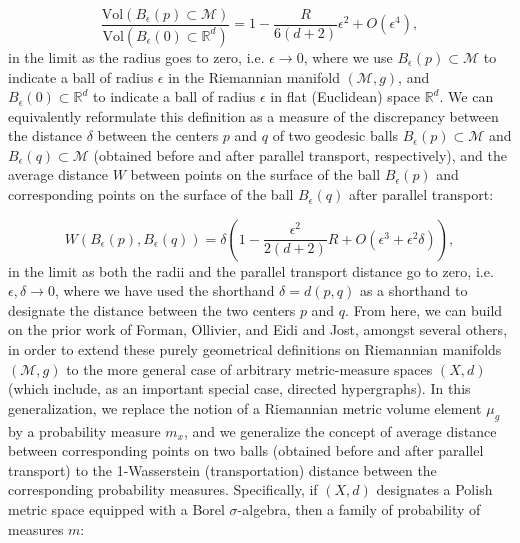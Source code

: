 \documentclass{article}
\begin{document}
\begin{equation}
\frac{\mathrm{Vol} \left( B_{\epsilon} \left( p \right) \subset \mathcal{M} \right)}{\mathrm{Vol} \left( B_{\epsilon} \left( 0 \right) \subset \mathbb{R}^d \right)} = 1 - \frac{R}{6 \left( d + 2 \right)} \epsilon^2 + O \left( \epsilon^4 \right),
\end{equation}
in the limit as the radius goes to zero, i.e. ${\epsilon \to 0}$, where we use ${B_{\epsilon} \left( p \right) \subset \mathcal{M}}$ to indicate a ball of radius ${\epsilon}$ in the Riemannian manifold ${\left( \mathcal{M}, g \right)}$, and ${B_{\epsilon} \left( 0 \right) \subset \mathbb{R}^d}$ to indicate a ball of radius ${\epsilon}$ in flat (Euclidean) space ${\mathbb{R}^d}$. We can equivalently reformulate this definition as a measure of the discrepancy between the distance ${\delta}$ between the centers $p$ and $q$ of two geodesic balls ${B_{\epsilon} \left( p \right) \subset \mathcal{M}}$ and ${B_{\epsilon} \left( q \right) \subset \mathcal{M}}$ (obtained before and after parallel transport, respectively), and the average distance $W$ between points on the surface of the ball ${B_{\epsilon} \left( p \right)}$ and corresponding points on the surface of the ball ${B_{\epsilon} \left( q \right)}$ after parallel transport:

\begin{equation}
W \left( B_{\epsilon} \left( p \right), B_{\epsilon} \left( q \right) \right) = \delta \left( 1 - \frac{\epsilon^2}{2 \left( d + 2 \right)} R + O \left( \epsilon^3 + \epsilon^2 \delta \right) \right),
\end{equation}
in the limit as both the radii and the parallel transport distance go to zero, i.e. ${\epsilon, \delta \to 0}$, where we have used the shorthand ${\delta = d \left( p, q \right)}$ as a shorthand to designate the distance between the two centers $p$ and $q$. From here, we can build on the prior work of Forman\cite{forman}, Ollivier\cite{ollivier}\cite{ollivier2}\cite{ollivier3}, and Eidi and Jost\cite{eidi}, amongst several others, in order to extend these purely geometrical definitions on Riemannian manifolds ${\left( \mathcal{M}, g \right)}$ to the more general case of arbitrary metric-measure spaces ${\left( X, d \right)}$ (which include, as an important special case, directed hypergraphs). In this generalization, we replace the notion of a Riemannian metric volume element ${\mu_g}$ by a probability measure ${m_x}$, and we generalize the concept of average distance between corresponding points on two balls (obtained before and after parallel transport) to the 1-Wasserstein (transportation) distance between the corresponding probability measures. Specifically, if ${\left( X, d \right)}$ designates a Polish metric space equipped with a Borel ${\sigma}$-algebra, then a family of probability of measures $m$:
\end{document}
